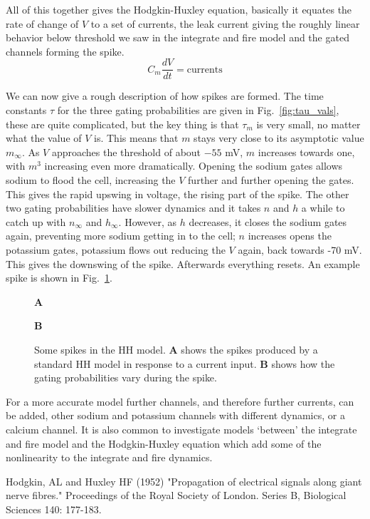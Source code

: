 \documentclass[11pt,a4paper]{scrartcl}
\begin{document}
All of this together gives the Hodgkin-Huxley equation, basically it
equates the rate of change of $V$ to a set of currents, the leak
current giving the roughly linear behavior below threshold we saw in
the integrate and fire model and the gated channels forming the
spike.
\begin{equation}
C_m\frac{dV}{dt}=\mbox{currents}
\end{equation}

We can now give a rough description of how spikes are formed. The time
constants $\tau$ for the three gating probabilities are given in
Fig.~\ref{fig:tau_vals}, these are quite complicated, but the key
thing is that $\tau_m$ is very small, no matter what the value of $V$
is. This means that $m$ stays very close to its asymptotic value
$m_\infty$. As $V$ approaches the threshold of about $-55$ mV, $m$
increases towards one, with $m^3$ increasing even more
dramatically. Opening the sodium gates allows sodium to flood the
cell, increasing the $V$ further and further opening the gates. This
gives the rapid upswing in voltage, the rising part of the spike. The
other two gating probabilities have slower dynamics and it takes $n$
and $h$ a while to catch up with $n_\infty$ and $h_\infty$. However,
as $h$ decreases, it closes the sodium gates again, preventing more
sodium getting in to the cell; $n$ increases opens the potassium
gates, potassium flows out reducing the $V$ again, back towards -70
mV. This gives the downswing of the spike. Afterwards everything
resets. An example spike is shown in Fig.~\ref{fig:HH_spike}.

\begin{figure}
\textbf{A}
\begin{center}

\end{center}
\textbf{B}
\begin{center}

\end{center}
\caption{Some spikes in the HH model. \textbf{A} shows the spikes produced by a standard HH model in response to a current input. \textbf{B} shows how the gating probabilities vary during the spike.\label{fig:HH_spike}}
\end{figure}

For a more accurate model further channels, and therefore further
currents, can be added, other sodium and potassium channels with
different dynamics, or a calcium channel. It is also common to
investigate models \lq{}between\rq{} the integrate and fire model and
the Hodgkin-Huxley equation which add some of the nonlinearity to the
integrate and fire dynamics.


\begin{thebibliography}{99}
Hodgkin, AL and Huxley HF (1952) 
\newblock"Propagation of electrical signals along giant nerve fibres." 
\newblock Proceedings of the Royal Society of London. Series B, Biological Sciences 140: 177-183.
\end{thebibliography}
\end{document}

